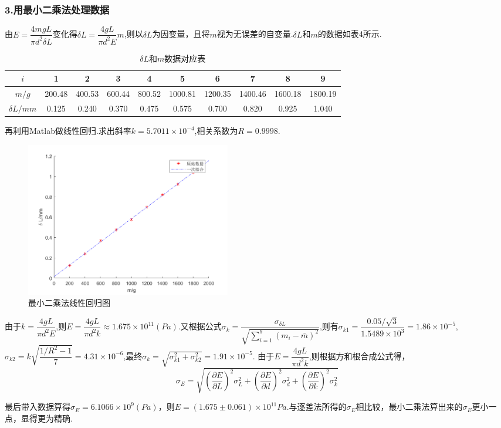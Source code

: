 \documentclass[12pt,a4paper,UTF8]{ctexart}
\begin{document}
\subsubsection*{3.用最小二乘法处理数据}
由$E=\dfrac{4mgL}{\pi d^2 \delta L}$变化得$\delta L=\dfrac{4gL}{\pi d^2 E}m$,则以$\delta L$为因变量，且将$m$视为无误差的自变量.$\delta L$和$m$的数据如表4所示.
\begin{table}[htbp]
\centering
\caption{$\delta L$和$m$数据对应表}
\begin{tabular}{cccccccccc}
\toprule
$i$&1&2&3&4&5&6&7&8&9 \\
\hline
$m/g$&200.48&400.53&600.44&800.52&1000.81&1200.35&1400.46&1600.18&1800.19 \\
\hline
$\delta L/mm$&0.125&0.240&0.370&0.475&0.575&0.700&0.820&0.925&1.040 \\
\bottomrule
\end{tabular}
\end{table}
\par
再利用Matlab做线性回归.求出斜率$k=5.7011\times10^{-4}$,相关系数为$R=0.9998$.\par
\begin{figure}[htbp]
		\centering
		\includegraphics[width=9cm]{huigui.png}
		\caption{最小二乘法线性回归图}
	\end{figure}
由于$k=\dfrac{4gL}{\pi d^2 E}$,则$E=\dfrac{4gL}{\pi d^2 k}\approx 1.675\times10^{11}(Pa)$.又根据公式$\sigma_k=\dfrac{\sigma_{\delta L}}{\sqrt{\sum_{i=1}^{9}(m_i-\bar m)^2}}$,则有$\sigma_{k1}=\dfrac{0.05/\sqrt{3}}{1.5489\times 10^3}=1.86\times10^{-5}$,$\sigma_{k2}=k\sqrt{\dfrac{1/R^2-1}{7}}=4.31\times 10^{-6}$,最终$\sigma_k=\sqrt{\sigma_{k1}^2+\sigma_{k2}^2}=1.91\times10^{-5}$.
由于$E=\dfrac{4gL}{\pi d^2 k}$,则根据方和根合成公式得，
$$
\sigma_E=\sqrt{(\frac{\partial E}{\partial L})^2\sigma_L^2+(\frac{\partial E}{\partial d})^2\sigma_d^2+(\frac{\partial E}{\partial k})^2\sigma_k^2}
$$
\par
最后带入数据算得$\sigma_E=6.1066\times10^{9}(Pa)$，则$E=(1.675\pm0.061)\times 10^{11} Pa$.与逐差法所得的$\sigma_E$相比较，最小二乘法算出来的$\sigma_E$更小一点，显得更为精确.
\end{document}
